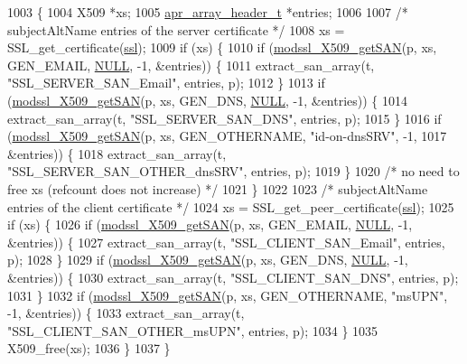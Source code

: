 \begin{DoxyCode}
1003 \{
1004     X509 *xs;
1005     \hyperlink{structapr__array__header__t}{apr\_array\_header\_t} *entries;
1006 
1007     \textcolor{comment}{/* subjectAltName entries of the server certificate */}
1008     xs = SSL\_get\_certificate(\hyperlink{group__MOD__SSL_ga91d808d6c1c01029f9c9260b9b69a437}{ssl});
1009     \textcolor{keywordflow}{if} (xs) \{
1010         \textcolor{keywordflow}{if} (\hyperlink{group__MOD__SSL__UTIL_gadc03fd52fbd4883723b4caa24915e595}{modssl\_X509\_getSAN}(p, xs, GEN\_EMAIL, \hyperlink{pcre_8txt_ad7f989d16aa8ca809a36bc392c07fba1}{NULL}, -1, &entries)) \{
1011             extract\_san\_array(t, \textcolor{stringliteral}{"SSL\_SERVER\_SAN\_Email"}, entries, p);
1012         \}
1013         \textcolor{keywordflow}{if} (\hyperlink{group__MOD__SSL__UTIL_gadc03fd52fbd4883723b4caa24915e595}{modssl\_X509\_getSAN}(p, xs, GEN\_DNS, \hyperlink{pcre_8txt_ad7f989d16aa8ca809a36bc392c07fba1}{NULL}, -1, &entries)) \{
1014             extract\_san\_array(t, \textcolor{stringliteral}{"SSL\_SERVER\_SAN\_DNS"}, entries, p);
1015         \}
1016         \textcolor{keywordflow}{if} (\hyperlink{group__MOD__SSL__UTIL_gadc03fd52fbd4883723b4caa24915e595}{modssl\_X509\_getSAN}(p, xs, GEN\_OTHERNAME, \textcolor{stringliteral}{"id-on-dnsSRV"}, -1,
1017                                &entries)) \{
1018             extract\_san\_array(t, \textcolor{stringliteral}{"SSL\_SERVER\_SAN\_OTHER\_dnsSRV"}, entries, p);
1019         \}
1020         \textcolor{comment}{/* no need to free xs (refcount does not increase) */}
1021     \}
1022 
1023     \textcolor{comment}{/* subjectAltName entries of the client certificate */}
1024     xs = SSL\_get\_peer\_certificate(\hyperlink{group__MOD__SSL_ga91d808d6c1c01029f9c9260b9b69a437}{ssl});
1025     \textcolor{keywordflow}{if} (xs) \{
1026         \textcolor{keywordflow}{if} (\hyperlink{group__MOD__SSL__UTIL_gadc03fd52fbd4883723b4caa24915e595}{modssl\_X509\_getSAN}(p, xs, GEN\_EMAIL, \hyperlink{pcre_8txt_ad7f989d16aa8ca809a36bc392c07fba1}{NULL}, -1, &entries)) \{
1027             extract\_san\_array(t, \textcolor{stringliteral}{"SSL\_CLIENT\_SAN\_Email"}, entries, p);
1028         \}
1029         \textcolor{keywordflow}{if} (\hyperlink{group__MOD__SSL__UTIL_gadc03fd52fbd4883723b4caa24915e595}{modssl\_X509\_getSAN}(p, xs, GEN\_DNS, \hyperlink{pcre_8txt_ad7f989d16aa8ca809a36bc392c07fba1}{NULL}, -1, &entries)) \{
1030             extract\_san\_array(t, \textcolor{stringliteral}{"SSL\_CLIENT\_SAN\_DNS"}, entries, p);
1031         \}
1032         \textcolor{keywordflow}{if} (\hyperlink{group__MOD__SSL__UTIL_gadc03fd52fbd4883723b4caa24915e595}{modssl\_X509\_getSAN}(p, xs, GEN\_OTHERNAME, \textcolor{stringliteral}{"msUPN"}, -1, &entries)) \{
1033             extract\_san\_array(t, \textcolor{stringliteral}{"SSL\_CLIENT\_SAN\_OTHER\_msUPN"}, entries, p);
1034         \}
1035         X509\_free(xs);
1036     \}
1037 \}
\end{DoxyCode}



